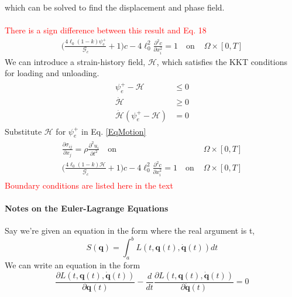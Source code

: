 \documentclass[12pt,3p]{article}
\numberwithin{equation}{section}
\begin{document}
which can be solved to find the displacement and phase field. \\ \\
\textcolor{red}{There is a sign difference between this result and Eq. 18}
\begin{align*}
\bigg( \frac{4 \ell_0 (1 - k) \psi_{\mathrm{e}}^{+}}{\mathcal{G}_c} + 1 \bigg) c - 4 \ell_{0}^2 \frac{\partial^2 c}{\partial x_i^2} = 1 \quad \text{on }& \Omega \times [0, T]
\end{align*}
We can introduce a strain-history field, $\mathcal{H}$, which satisfies the KKT conditions for loading and unloading.
\begin{align}
\begin{split}
\psi_{e}^{+}-\mathcal{H} &\leqslant 0 \\
\dot{\mathcal{H}} &\geqslant 0 \\
\dot{\mathcal{H}}\left(\psi_{e}^{+} - \mathcal{H}\right) &= 0
\end{split}
\end{align}
Substitute $\mathcal{H}$ for $\psi_{e}^{+}$ in Eq. \ref{EqMotion}
\begin{align}\label{EqMotionHistoryField}
\begin{split}
\frac{\partial \sigma_{i j}}{\partial x_j} = \rho \frac{\partial^2 u_i}{\partial t^2} \quad \text{on }& \Omega \times [0, T]\\
\bigg( \frac{4 \ell_0 (1 - k) \mathcal{H}}{\mathcal{G}_c} + 1 \bigg) c - 4 \ell_{0}^2 \frac{\partial^2 c}{\partial x_i^2} = 1 \quad \text{on }& \Omega \times [0, T]
\end{split}
\end{align}
\textcolor{red}{Boundary conditions are listed here in the text }
\paragraph{Notes on the Euler-Lagrange Equations \\} 
Say we're given an equation in the form where the real argument is t, 
\begin{equation*}
S (\mathbf{q}) = \int_{a}^{b} L (t, \mathbf{q}(t), \dot{\mathbf{q}} (t)) dt 
\end{equation*}
We can write an equation in the form
\begin{equation*}
\frac{\partial L(t, \mathbf{q}(t), \dot{\mathbf{q}} (t))}{\partial \mathbf{q} (t)}  - \frac{d}{dt} \frac{\partial L(t, \mathbf{q}(t), \dot{\mathbf{q}} (t))}{\partial \dot{\mathbf{q}} (t)} = 0
\end{equation*}
\end{document}
